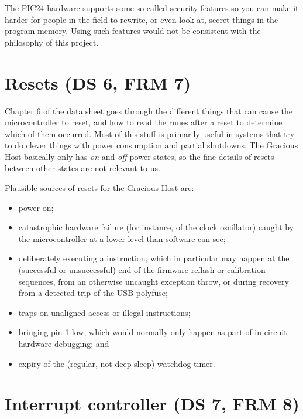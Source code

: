 The PIC24 hardware supports some so-called security features so you can make
it harder for people in the field to rewrite, or even look at, secret
things in the program memory.  Using such features would not be consistent
with the philosophy of this project.


\section{Resets (DS 6, FRM 7)}

Chapter 6 of the data sheet goes through the different things that can cause
the microcontroller to reset, and how to read the runes after a reset to
determine which of them occurred.  Most of this stuff is primarily useful
in systems that try to do clever things with power consumption and partial
shutdowns.  The Gracious Host basically only has \emph{on} and \emph{off}
power states, so the fine details of resets between other states are not
relevant to us.

Plausible sources of resets for the Gracious Host are:
\begin{itemize}
  \item power on;
  \item catastrophic hardware failure (for instance, of the clock
    oscillator) caught by the microcontroller at a lower level
    than software can see;
  \item deliberately executing a  instruction, which in
    particular may happen at the
    (successful or unsuccessful) end of the firmware reflash or calibration
    sequences, from an otherwise uncaught exception throw, or during
    recovery from a detected trip of the USB polyfuse;
  \item traps on unaligned access or illegal instructions;
  \item bringing pin 1 low, which would normally only happen as part of
    in-circuit hardware debugging; and
  \item expiry of the (regular, not deep-sleep) watchdog timer.
\end{itemize}


\section{Interrupt controller (DS 7, FRM 8)}

